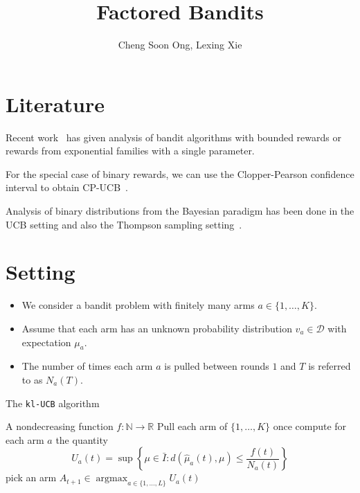 \documentclass[a4paper,11pt]{article}
\title{Factored Bandits}
\author{Cheng Soon Ong, Lexing Xie}
\newcommand{\NN}{\mathbb{N}}
\newcommand{\RR}{\mathbb{R}}
\DeclareMathOperator{\argmax}{\mathrm{argmax}}
\newcommand{\muhat}{\widehat{\mu}}
\newcommand{\Dcal}{\mathcal{D}}
\begin{document}
\maketitle

\section{Literature}

Recent work~\cite{garivier11kluabs,maillard11finama,cappe13kulucb} has
given analysis of bandit algorithms with bounded rewards or rewards
from exponential families with a single parameter.

For the special case of binary rewards, we can use the Clopper-Pearson
confidence interval to obtain CP-UCB~\cite{garivier11kluabs}.

Analysis of binary distributions from the Bayesian paradigm has been
done in the UCB setting and also the Thompson sampling
setting~\cite{kaufmann12bayucb,kaufmann12thosao,korda13thosde}.


\section{Setting}

\begin{itemize}
\item We consider a bandit problem with finitely many arms
  $a\in\{1,\ldots,K\}$.
\item Assume that each arm has an unknown probability distribution
  $v_a\in\Dcal$ with expectation $\mu_a$.
\item The number of times each arm $a$ is pulled between rounds $1$
  and $T$ is referred to as $N_a(T)$.
\end{itemize}

\begin{algorithm}
  \label{alg:kl-UCB}
  \caption{The \texttt{kl-UCB} algorithm \cite[Algorithm 2]{cappe13kulucb}}
  \begin{algorithmic}
    \Require A nondecreasing function $f:\NN\to\RR$
    \State Pull each arm of $\{1, \ldots, K\}$ once
    \State compute for each arm $a$ the quantity
    \begin{equation}
      \label{eq:ucb}
      U_a(t) = \sup\left\{
        \mu\in\bar{I}: d(\muhat_a(t), \mu) \leqslant \frac{f(t)}{N_a(t)}
      \right\}      
    \end{equation}
    \State pick an arm 
    $A_{t+1}\in \argmax_{a\in\{1,\ldots,L\}} U_a(t)$
    \EndFor
  \end{algorithmic}
\end{algorithm}
\end{document}

